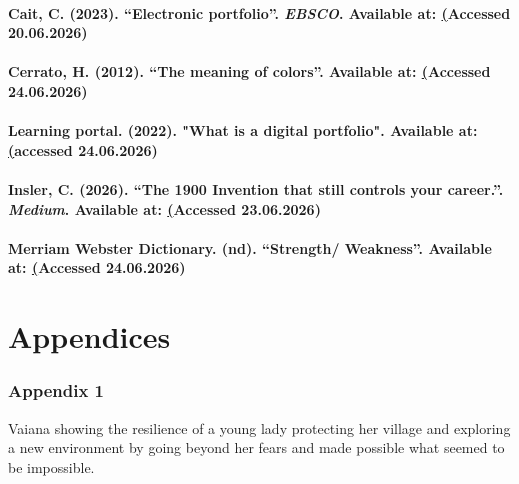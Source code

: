 \documentclass[12pt]{article}
\begin{document}
\paragraph {Cait, C. (2023). “Electronic portfolio”. \textit{EBSCO}. Available at:  \href {https://www.ebsco.com/research-starters/business-and-management/electronic-portfolio} (Accessed 20.06.2026)}

\paragraph {Cerrato, H. (2012). “The meaning of colors”. Available at:  \href  {https://blocs.xtec.cat/gemmasalvia1617/files/2017/02/the-meaning-of-colors-book.pdf} (Accessed 24.06.2026)}

\paragraph {Learning portal. (2022). "What is a digital portfolio". Available at:\href  {https://tlp-lpa.ca/digital-skills/digital-portfolio} (accessed 24.06.2026)}



\paragraph {Insler, C. (2026). “The 1900 Invention that still controls your career.”.\textit{ Medium}. Available at: \href {https://medium.com/the-managers-mind-a-history-of-work/the-1900-invention-that-still-controls-your-career-0a5444a3ae23} (Accessed 23.06.2026)}

\paragraph {Merriam Webster Dictionary. (nd). “Strength/ Weakness”. Available at: \href {https://www.merriam-webster.com/dictionary/strength} (Accessed 24.06.2026)}



\newpage



\section{Appendices}
\subsubsection{Appendix 1}

Vaiana showing the resilience of a young lady protecting her village and exploring a new environment by going beyond her fears and made possible what seemed to be impossible.
 
\end{document}
